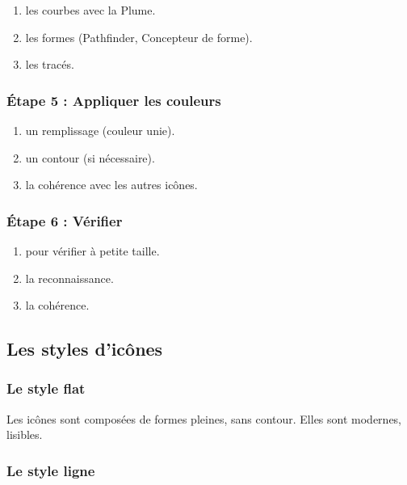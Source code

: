 \begin{enumerate}
    \item {} les courbes avec la Plume.
    \item {} les formes (Pathfinder, Concepteur de forme).
    \item {} les tracés.
\end{enumerate}

\subsubsection{Étape 5 : Appliquer les couleurs}

\begin{enumerate}
    \item {} un remplissage (couleur unie).
    \item {} un contour (si nécessaire).
    \item {} la cohérence avec les autres icônes.
\end{enumerate}

\subsubsection{Étape 6 : Vérifier}

\begin{enumerate}
    \item {} pour vérifier à petite taille.
    \item {} la reconnaissance.
    \item {} la cohérence.
\end{enumerate}

\subsection{Les styles d'icônes}

\subsubsection{Le style flat}

Les icônes  sont composées de formes pleines, sans contour. Elles sont modernes, lisibles.

\subsubsection{Le style ligne}

